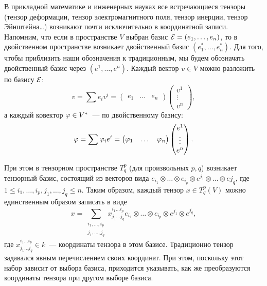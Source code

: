 В прикладной математике и инженерных науках все встречающиеся тензоры
(тензор деформации, тензор электромагнитного поля, тензор инерции,
тензор Эйнштейна\dots) возникают почти исключительно в координатной
записи.
Напомним, что если в пространстве $V$ выбран базис $\mathcal E=(e_1,\dots,e_n)$,
то в двойственном пространстве возникает двойственный базис
$(e_1^*,\dots,e_n^*)$. Для того, чтобы приблизить наши обозначения к
традиционным, мы будем обозначать двойственный базис через
$(e^1,\dots,e^n)$.
Каждый вектор $v\in V$ можно разложить по базису $\mathcal E$:
$$
v = \sum e_i v^i = \begin{pmatrix}e_1 & \dots & e_n\end{pmatrix}
\begin{pmatrix}v^1\\\vdots\\ v^n\end{pmatrix},
$$
а каждый ковектор $\varphi\in V^*$~--- по двойственному базису:
$$
\varphi = \sum \varphi_i e^i = \begin{pmatrix}\varphi_1 & \dots &
  \varphi_n\end{pmatrix}
\begin{pmatrix}e^1\\\vdots\\ e^n\end{pmatrix}.
$$

При этом в тензорном пространстве $T^p_q$ (для произвольных $p,q$)
возникает тензорный базис, состоящий из векторов вида
$e_{i_1}\otimes\dots\otimes e_{i_p}\otimes
e^{j_1}\otimes\dots\otimes e{j_q}$, где
$1\leq i_1,\dots,i_p,j_1,\dots,j_q\leq n$.
Таким образом, каждый тензор $x\in T^p_q(V)$ можно единственным
образом записать в виде
$$
x = \sum_{\substack{i_1,\dots,i_p \\ j_1,\dots,j_q}}
x^{i_1\dots i_p}_{j_1\dots j_q} e_{i_1}\otimes\dots\otimes
e_{i_p}\otimes e^{j_1}\otimes e^{j_q},
$$
где $x^{i_1\dots i_p}_{j_1\dots j_q}\in k$~--- координаты тензора в
этом базисе.
Традиционно тензор задавался явным перечислением своих координат. При
этом, поскольку этот набор зависит от выбора базиса, приходится
указывать, как же преобразуются координаты тензора при другом выборе
базиса.

